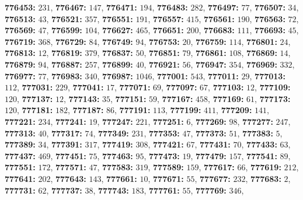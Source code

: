 \textsf{\bfseries 776453:} $231$, \textsf{\bfseries 776467:} $147$, \textsf{\bfseries 776471:} $194$, \textsf{\bfseries 776483:} $282$, \textsf{\bfseries 776497:} $77$, \textsf{\bfseries 776507:} $34$, \textsf{\bfseries 776513:} $43$, \textsf{\bfseries 776521:} $357$, \textsf{\bfseries 776551:} $191$, \textsf{\bfseries 776557:} $415$, \textsf{\bfseries 776561:} $190$, \textsf{\bfseries 776563:} $72$, \textsf{\bfseries 776569:} $47$, \textsf{\bfseries 776599:} $104$, \textsf{\bfseries 776627:} $465$, \textsf{\bfseries 776651:} $200$, \textsf{\bfseries 776683:} $111$, \textsf{\bfseries 776693:} $45$, \textsf{\bfseries 776719:} $368$, \textsf{\bfseries 776729:} $84$, \textsf{\bfseries 776749:} $94$, \textsf{\bfseries 776753:} $20$, \textsf{\bfseries 776759:} $114$, \textsf{\bfseries 776801:} $24$, \textsf{\bfseries 776813:} $12$, \textsf{\bfseries 776819:} $379$, \textsf{\bfseries 776837:} $50$, \textsf{\bfseries 776851:} $79$, \textsf{\bfseries 776861:} $108$, \textsf{\bfseries 776869:} $14$, \textsf{\bfseries 776879:} $94$, \textsf{\bfseries 776887:} $257$, \textsf{\bfseries 776899:} $40$, \textsf{\bfseries 776921:} $56$, \textsf{\bfseries 776947:} $354$, \textsf{\bfseries 776969:} $332$, \textsf{\bfseries 776977:} $77$, \textsf{\bfseries 776983:} $340$, \textsf{\bfseries 776987:} $1046$, \textsf{\bfseries 777001:} $543$, \textsf{\bfseries 777011:} $29$, \textsf{\bfseries 777013:} $112$, \textsf{\bfseries 777031:} $229$, \textsf{\bfseries 777041:} $17$, \textsf{\bfseries 777071:} $69$, \textsf{\bfseries 777097:} $67$, \textsf{\bfseries 777103:} $12$, \textsf{\bfseries 777109:} $120$, \textsf{\bfseries 777137:} $12$, \textsf{\bfseries 777143:} $35$, \textsf{\bfseries 777151:} $59$, \textsf{\bfseries 777167:} $458$, \textsf{\bfseries 777169:} $61$, \textsf{\bfseries 777173:} $120$, \textsf{\bfseries 777181:} $182$, \textsf{\bfseries 777187:} $86$, \textsf{\bfseries 777191:} $113$, \textsf{\bfseries 777199:} $411$, \textsf{\bfseries 777209:} $141$, \textsf{\bfseries 777221:} $234$, \textsf{\bfseries 777241:} $19$, \textsf{\bfseries 777247:} $221$, \textsf{\bfseries 777251:} $6$, \textsf{\bfseries 777269:} $98$, \textsf{\bfseries 777277:} $247$, \textsf{\bfseries 777313:} $40$, \textsf{\bfseries 777317:} $74$, \textsf{\bfseries 777349:} $231$, \textsf{\bfseries 777353:} $47$, \textsf{\bfseries 777373:} $51$, \textsf{\bfseries 777383:} $5$, \textsf{\bfseries 777389:} $34$, \textsf{\bfseries 777391:} $317$, \textsf{\bfseries 777419:} $308$, \textsf{\bfseries 777421:} $67$, \textsf{\bfseries 777431:} $70$, \textsf{\bfseries 777433:} $63$, \textsf{\bfseries 777437:} $469$, \textsf{\bfseries 777451:} $75$, \textsf{\bfseries 777463:} $95$, \textsf{\bfseries 777473:} $19$, \textsf{\bfseries 777479:} $157$, \textsf{\bfseries 777541:} $89$, \textsf{\bfseries 777551:} $172$, \textsf{\bfseries 777571:} $47$, \textsf{\bfseries 777583:} $319$, \textsf{\bfseries 777589:} $159$, \textsf{\bfseries 777617:} $66$, \textsf{\bfseries 777619:} $212$, \textsf{\bfseries 777641:} $202$, \textsf{\bfseries 777643:} $143$, \textsf{\bfseries 777661:} $10$, \textsf{\bfseries 777671:} $55$, \textsf{\bfseries 777677:} $232$, \textsf{\bfseries 777683:} $2$, \textsf{\bfseries 777731:} $62$, \textsf{\bfseries 777737:} $38$, \textsf{\bfseries 777743:} $183$, \textsf{\bfseries 777761:} $55$, \textsf{\bfseries 777769:} $346$, 
